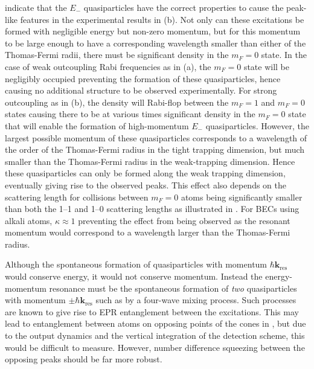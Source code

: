  indicate that the $E_-$ quasiparticles have the correct properties to cause the peak-like features in the experimental results in (b). Not only can these excitations be formed with negligible energy but non-zero momentum, but for this momentum to be large enough to have a corresponding wavelength smaller than either of the Thomas-Fermi radii, there must be significant density in the $m_F=0$ state. In the case of weak outcoupling Rabi frequencies as in (a), the $m_F=0$ state will be negligibly occupied preventing the formation of these quasiparticles, hence causing no additional structure to be observed experimentally. For strong outcoupling as in (b), the density will Rabi-flop between the $m_F=1$ and $m_F=0$ states causing there to be at various times significant density in the $m_F=0$ state that will enable the formation of high-momentum $E_-$ quasiparticles.  However, the largest possible momentum of these quasiparticles corresponds to a wavelength of the order of the Thomas-Fermi radius in the tight trapping dimension, but much smaller than the Thomas-Fermi radius in the weak-trapping dimension. Hence these quasiparticles can only be formed along the weak trapping dimension, eventually giving rise to the observed peaks. This effect also depends on the scattering length for collisions between $m_F=0$ atoms being significantly smaller than both the 1--1 and 1--0 scattering lengths as illustrated in . For BECs using alkali atoms, $\kappa \approx 1$ preventing the effect from being observed as the resonant momentum would correspond to a wavelength larger than the Thomas-Fermi radius.

Although the spontaneous formation of quasiparticles with momentum $\hbar \mathbf{k}_\text{res}$ would conserve energy, it would not conserve momentum. Instead the energy-momentum resonance must be the spontaneous formation of \emph{two} quasiparticles with momentum $\pm \hbar \mathbf{k}_\text{res}$ such as by a four-wave mixing process. Such processes are known to give rise to EPR entanglement between the excitations. This may lead to entanglement between atoms on opposing points of the cones in , but due to the output dynamics and the vertical integration of the detection scheme, this would be difficult to measure. However, number difference squeezing between the opposing peaks should be far more robust.

